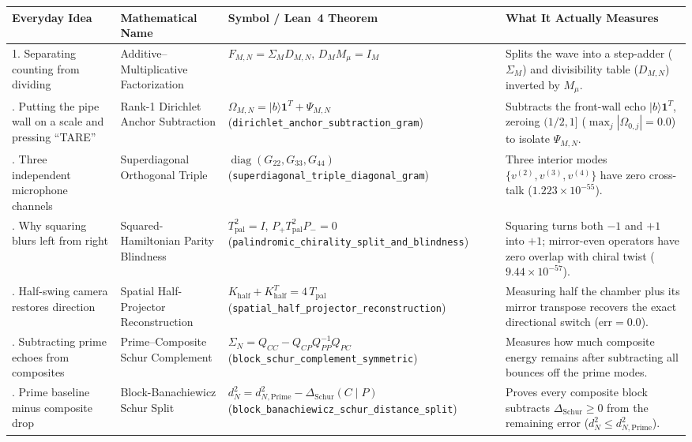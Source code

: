 \documentclass[11pt,a4paper]{article}
\begin{document}
\begin{table}[htbp]
\centering
\scriptsize
\setlength{\tabcolsep}{4pt}
\begin{tabular}{@{}p{3.0cm}p{3.1cm}p{4.1cm}p{4.8cm}@{}}
\toprule
\textbf{Everyday Idea} & \textbf{Mathematical Name} & \textbf{Symbol / Lean~4 Theorem} & \textbf{What It Actually Measures} \\
\midrule
1. Separating counting from dividing & Additive--Multiplicative Factorization & $F_{M,N} = \Sigma_M D_{M,N}$, $D_M M_\mu = I_M$ & Splits the wave into a step-adder ($\Sigma_M$) and divisibility table ($D_{M,N}$) inverted by $M_\mu$. \\
\addlinespace
2. Putting the pipe wall on a scale and pressing ``TARE'' & Rank-1 Dirichlet Anchor Subtraction & $\Omega_{M,N} = |b\rangle\mathbf{1}^T + \Psi_{M,N}$ (\texttt{dirichlet\_anchor\_subtraction\_gram}) & Subtracts the front-wall echo $|b\rangle\mathbf{1}^T$, zeroing $(1/2,1]$ ($\max_j |\Omega_{0,j}| = 0.0$) to isolate $\Psi_{M,N}$. \\
\addlinespace
3. Three independent microphone channels & Superdiagonal Orthogonal Triple & $\operatorname{diag}(G_{22}, G_{33}, G_{44})$ (\texttt{superdiagonal\_triple\_diagonal\_gram}) & Three interior modes $\{v^{(2)}, v^{(3)}, v^{(4)}\}$ have zero cross-talk ($1.223\times 10^{-55}$). \\
\addlinespace
4. Why squaring blurs left from right & Squared-Hamiltonian Parity Blindness & $T_{\mathrm{pal}}^2 = I$, $P_+ T_{\mathrm{pal}}^2 P_- = 0$ (\texttt{palindromic\_chirality\_split\_and\_blindness}) & Squaring turns both $-1$ and $+1$ into $+1$; mirror-even operators have zero overlap with chiral twist ($9.44\times 10^{-57}$). \\
\addlinespace
5. Half-swing camera restores direction & Spatial Half-Projector Reconstruction & $K_{\mathrm{half}} + K_{\mathrm{half}}^T = 4\,T_{\mathrm{pal}}$ (\texttt{spatial\_half\_projector\_reconstruction}) & Measuring half the chamber plus its mirror transpose recovers the exact directional switch ($\text{err} = 0.0$). \\
\addlinespace
6. Subtracting prime echoes from composites & Prime--Composite Schur Complement & $\Sigma_N = Q_{CC} - Q_{CP}Q_{PP}^{-1}Q_{PC}$ (\texttt{block\_schur\_complement\_symmetric}) & Measures how much composite energy remains after subtracting all bounces off the prime modes. \\
\addlinespace
7. Prime baseline minus composite drop & Block-Banachiewicz Schur Split & $d_N^2 = d_{N,\mathrm{Prime}}^2 - \Delta_{\mathrm{Schur}}(C\mid P)$ (\texttt{block\_banachiewicz\_schur\_distance\_split}) & Proves every composite block subtracts $\Delta_{\mathrm{Schur}} \ge 0$ from the remaining error ($d_N^2 \le d_{N,\mathrm{Prime}}^2$). \\

\end{tabular}
\end{table}
\end{document}
